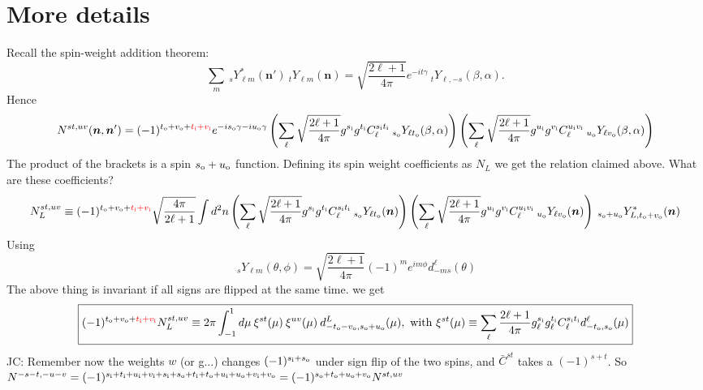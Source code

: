 \documentclass{article}
\newcommand{\si}[0]{{s_{\rm i}}}
\newcommand{\ti}[0]{{t_{\rm i}}}
\newcommand{\ui}[0]{{u_{\rm i}}}
\newcommand{\vi}[0]{{v_{\rm i}}}
\newcommand{\so}[0]{{s_{\rm o}}}
\renewcommand{\to}[0]{{t_{\rm o}}}
\newcommand{\uo}[0]{{u_{\rm o}}}
\newcommand{\vo}[0]{{v_{\rm o}}}
\newcommand{\Ylm}[1]{\:_{#1}Y_{\ell m}}
\newcommand{\Ylms}[1]{\:_{#1}Y^*_{\ell m}}
\newcommand{\red}[1]{\color{red}#1 \color{black} }
\newcommand{\JC}[1]{\color{red}JC: #1\color{black}}
\newcommand{\hn}[0]{\boldsymbol{n}}
\begin{document}
\section{More details}
Recall the spin-weight addition theorem:
\begin{equation}
	\sum_m \Ylms {s}(\hn') \Ylm {t} (\hn) =\sqrt{\frac{2\ell + 1}{4\pi}} e^{- i t \gamma} \:_t Y_{\ell, -s}(\beta, \alpha).
\end{equation}
Hence 
\begin{equation}
	N^{st,uv}(\hn, \hn') = (-1)^{\to + \vo + \red{\ti + \vi}} e^{-i \so \gamma -i \uo \gamma} \left(\sum_\ell \sqrt{\frac{2\ell + 1}{4\pi}} g^{\si}g^{\ti} C_\ell^{\si \ti} \:_{\so}Y_{\ell \to}(\beta ,\alpha)\right) \left(\sum_\ell \sqrt{\frac{2\ell + 1}{4\pi}} g^{\ui}g^{\vi} C_\ell^{\ui \vi} \:_{\uo}Y_{\ell \vo}(\beta ,\alpha)\right)
\end{equation}
The product of the brackets is a spin $\so + \uo$ function. Defining its spin weight coefficients as $N_L$ we get the relation claimed above. What are these coefficients? 
\begin{equation}
	N_L^{st,uv} \equiv(-1)^{\to + \vo+ \red{\ti + \vi}} \sqrt{\frac {4\pi}{2\ell + 1}} \int d^2n \left(\sum_\ell \sqrt{\frac{2\ell + 1}{4\pi}} g^{\si}g^{\ti} C_\ell^{\si \ti} \:_{\so}Y_{\ell \to}(\hn)\right) \left(\sum_\ell \sqrt{\frac{2\ell + 1}{4\pi}} g^{\ui}g^{\vi} C_\ell^{\ui \vi} \:_{\uo}Y_{\ell \vo}(\hn)\right)\:_{\so + \uo}Y^*_{L,\to + \vo}(\hn) 
\end{equation}
Using
\begin{equation}
	\boxed{\Ylm s(\theta, \phi) = \sqrt{\frac {2\ell + 1} {4\pi}}(-1)^m e^{i m \phi} d_{-m s}^\ell(\theta) }
\end{equation}
The above thing is invariant if all signs are flipped at the same time.
we get
\begin{equation}
\boxed{
(-1)^{\to + \vo+ \red{\ti + \vi}} N_L^{st,uv} \equiv 2\pi  \int_{-1}^1 d \mu \:\xi^{st}(\mu)\:\xi^{uv}(\mu)\: d^L_{-\to - \vo, \so + \uo}(\mu),\textrm{  with } \xi^{st}(\mu) \equiv  \sum_\ell \frac{2\ell + 1}{4\pi}g^\si_\ell g^\ti_\ell C_\ell^{\si \ti} d^\ell_{-\to,\so}(\mu)}
 \end{equation}
 \JC{Remember now the weights $w$ (or g...) changes $(-1)^{\si + \so}$ under sign flip of the two spins, and $\bar C^{st}$ takes a $(-1)^{s + t}$. So $N^{-s-t, -u-v} = (-1)^{\si + \ti + \ui + \vi + \si + \so + \ti + \to + \ui + \uo + \vi + \vo } = (-1)^{\so + \to + \uo + \vo }N^{st, uv}$ }
\end{document}
